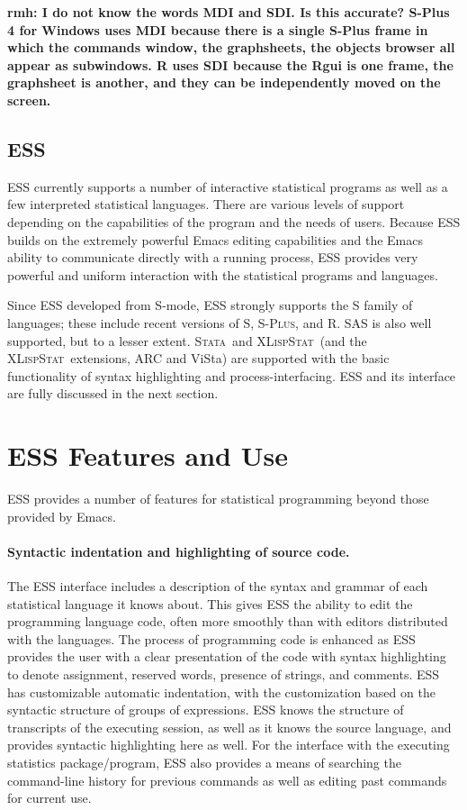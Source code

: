 \documentclass{article}
\newcommand*{\Splus}{\textsc{S-Plus}}
\newcommand*{\XLispStat}{\textsc{XLispStat}}
\newcommand*{\Stata}{\textsc{Stata}}
\begin{document}
\textbf{rmh: I do not know the words MDI and SDI.  Is this accurate?
S-Plus 4 for Windows uses MDI because there is a single S-Plus frame in which the
commands window, the graphsheets, the objects browser all appear as subwindows.
R uses SDI because the Rgui is one frame, the graphsheet is another, and they can
be independently moved on the screen.} 

\subsection{ESS}
\label{sec:UI:ESS}

ESS currently supports a number of interactive statistical programs as
well as a few interpreted statistical languages.  There are various
levels of support depending on the capabilities of the program and the
needs of users.  Because ESS builds on the extremely powerful Emacs
editing capabilities and the Emacs ability to communicate directly
with a running process, ESS provides very powerful and uniform
interaction with the statistical programs and languages.

Since ESS developed from S-mode, ESS strongly supports the S family of
languages; these include recent versions of S, \Splus, and R.  SAS is
also well supported, but to a lesser extent.  \Stata\ and \XLispStat\ 
(and the \XLispStat\ extensions, ARC and ViSta) are supported with the
basic functionality of syntax highlighting and process-interfacing.
ESS and its interface are fully discussed in the next section.

\section{ESS Features and Use}
\label{sec:basic}

ESS provides a number of features for statistical programming beyond
those provided by Emacs.

\paragraph{Syntactic indentation and highlighting of source code.}
The ESS interface includes a description of the syntax and grammar of
each statistical language it knows about.  This gives ESS the ability
to edit the programming language code, often more smoothly than with
editors distributed with the languages.  The process of programming
code is enhanced as ESS provides the user with a clear presentation of
the code with syntax highlighting to denote assignment, reserved
words, presence of strings, and comments.  ESS has customizable
automatic indentation, with the customization based on the syntactic
structure of groups of expressions.
ESS knows the structure of transcripts of the executing session,
as well as it knows the source language, and provides syntactic
highlighting here as well.
For the interface with the executing statistics package/program,
ESS also provides a means of searching the command-line history for
previous commands as well as editing past commands for current use.
\end{document}
